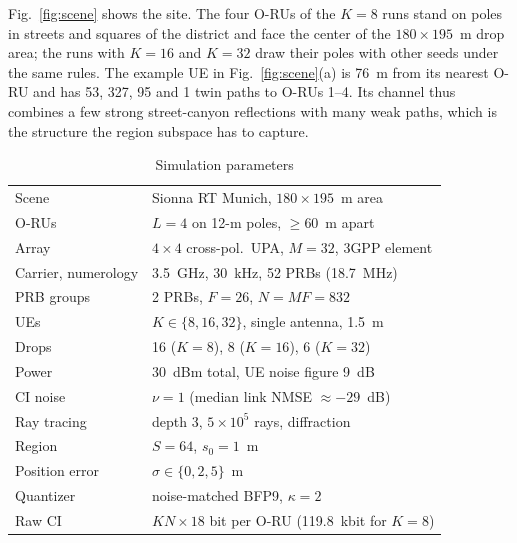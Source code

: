 \documentclass[journal]{IEEEtran}
\begin{document}
Fig.~\ref{fig:scene} shows the site. The four O-RUs of the $K=8$ runs stand on poles in streets and squares of the district and face the center of the $180\times195$~m drop area; the runs with $K=16$ and $K=32$ draw their poles with other seeds under the same rules. The example UE in Fig.~\ref{fig:scene}(a) is 76~m from its nearest O-RU and has 53, 327, 95 and 1 twin paths to O-RUs 1--4. Its channel thus combines a few strong street-canyon reflections with many weak paths, which is the structure the region subspace has to capture.

\begin{table}[t]
\centering
\caption{Simulation parameters}
\label{tab:setup}
\begin{tabular}{@{}ll@{}}
\toprule
Scene & Sionna RT Munich, $180\times195$~m area\\
O-RUs & $L=4$ on 12-m poles, $\ge60$~m apart\\
Array & $4\times4$ cross-pol.\ UPA, $M=32$, 3GPP element\\
Carrier, numerology & 3.5~GHz, 30~kHz, 52 PRBs (18.7~MHz)\\
PRB groups & 2 PRBs, $F=26$, $N=MF=832$\\
UEs & $K\in\{8,16,32\}$, single antenna, 1.5~m\\
Drops & 16 ($K=8$), 8 ($K=16$), 6 ($K=32$)\\
Power & 30~dBm total, UE noise figure 9~dB\\
CI noise & $\nu=1$ (median link NMSE $\approx-29$~dB)\\
Ray tracing & depth 3, $5\times10^5$ rays, diffraction\\
Region & $S=64$, $s_0=1$~m\\
Position error & $\sigma\in\{0,2,5\}$~m\\
Quantizer & noise-matched BFP9, $\kappa=2$\\
Raw CI & $KN\times18$ bit per O-RU (119.8~kbit for $K=8$)\\
\bottomrule
\end{tabular}
\end{table}
\end{document}
